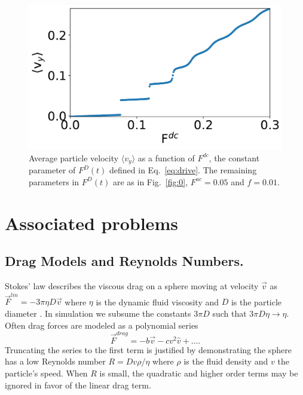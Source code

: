 \documentclass[twocolumn,preprintnumbers,amsmath,amssymb,aps,prx]{revtex4}
\begin{document}
\begin{center}
\begin{figure}[h!]
\centering
\includegraphics[width=\columnwidth]{sweep_FDC_vs_vx.pdf}
\caption{Average particle velocity  $\langle v_{y} \rangle$ as a function of $F^{dc}$,
  the constant parameter of $F^D(t)$ defined in Eq.~\ref{eq:drive}.
  The remaining parameters in $F^D(t)$ are as in Fig.~\ref{fig:0}, $F^{ac}=0.05$ and $f = 0.01$.  }
\label{fig:1}
\end{figure}
\end{center}


\section{Associated problems}
\label{sec:problems}	%

\subsection{Drag Models and Reynolds Numbers.}
  Stokes' law describes the viscous drag on a sphere
  moving at velocity $\vec{v}$ as 
  $\vec{F}^{lin} = -3 \pi \eta D \vec{v}$ 
  where $\eta$ is the dynamic fluid viscosity and 
  $D$ is the particle diameter \cite{Taylor2005}.
  In simulation we
  subsume the constants $3 \pi D$
  such that $3 \pi D \eta \rightarrow \eta $.
  Often drag forces are
  modeled as a polynomial series ~\cite{Taylor2005}
  \begin{equation}
    \vec{F}^{drag} = -b \vec{v} - c v^2 \hat{v} + \ldots  .
  \end{equation}
  Truncating the series to the first term
  is justified by demonstrating the sphere
  has a low Reynolds number  
  $R = D v \rho / \eta$
  where $\rho$ is the fluid density and $v$ the particle's speed.
  When $R$ is small, the quadratic and higher order terms
  may be ignored in favor of the linear drag term.
\end{document}
